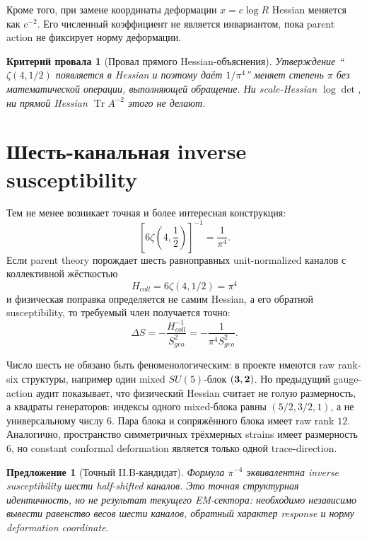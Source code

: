 \documentclass[12pt,a4paper]{article}
\newtheorem{proposition}{Предложение}
\newtheorem{nogocriterion}{Критерий провала}
\DeclareMathOperator{\Tr}{Tr}
\begin{document}
Кроме того, при замене координаты деформации $x=c\log R$ Hessian меняется как
$c^{-2}$. Его численный коэффициент не является инвариантом, пока parent action
не фиксирует норму деформации.

\begin{nogocriterion}[Провал прямого Hessian-объяснения]
Утверждение ``$\zeta(4,1/2)$ появляется в Hessian и поэтому даёт
$1/\pi^4$'' меняет степень $\pi$ без математической операции, выполняющей
обращение. Ни scale-Hessian $\log\det$, ни прямой Hessian $\Tr A^{-2}$ этого не
делают.
\end{nogocriterion}

\section{Шесть-канальная inverse susceptibility}

Тем не менее возникает точная и более интересная конструкция:
\begin{equation}
 \left[6\zeta\left(4,\frac12\right)\right]^{-1}
 =\frac1{\pi^4}.
\end{equation}
Если parent theory порождает шесть равноправных unit-normalized каналов с
коллективной жёсткостью
\begin{equation}
 H_{coll}=6\zeta(4,1/2)=\pi^4
\end{equation}
и физическая поправка определяется не самим Hessian, а его обратной
susceptibility, то требуемый член получается точно:
\begin{equation}
 \Delta S=-\frac{H_{coll}^{-1}}{S_{geo}^2}
 =-\frac1{\pi^4S_{geo}^2}.
\end{equation}

Число шесть не обязано быть феноменологическим: в проекте имеются raw rank-six
структуры, например один mixed $SU(5)$-блок $({\bf3},{\bf2})$. Но предыдущий
gauge-action аудит показывает, что физический Hessian считает не голую
размерность, а квадраты генераторов: индексы одного mixed-блока равны
$(5/2,3/2,1)$, а не универсальному числу $6$. Пара блока и сопряжённого блока
имеет raw rank $12$. Аналогично, пространство симметричных трёхмерных strains
имеет размерность $6$, но constant conformal deformation является только одной
trace-direction.

\begin{proposition}[Точный II.B-кандидат]
Формула $\pi^{-4}$ эквивалентна inverse susceptibility шести half-shifted
каналов. Это точная структурная идентичность, но не результат текущего
EM-сектора: необходимо независимо вывести равенство весов шести каналов,
обратный характер response и норму deformation coordinate.
\end{proposition}
\end{document}
